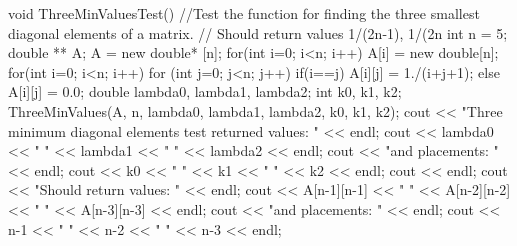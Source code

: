 \documentclass[norsk, 12pt]{article}
\begin{document}
void ThreeMinValuesTest(){
    //Test the function for finding the three smallest diagonal elements of a matrix.
    // Should return values 1/(2n-1), 1/(2n
    int n = 5;
    double ** A;
    A = new double* [n];
    for(int i=0; i<n; i++){
        A[i] = new double[n];
    }
    for(int i=0; i<n; i++){
        for (int j=0; j<n; j++){
            if(i==j){
                A[i][j] = 1./(i+j+1);
            }
            else{
                A[i][j] = 0.0;
            }
        }
    }
    double lambda0, lambda1, lambda2;
    int k0, k1, k2;
    ThreeMinValues(A, n, lambda0, lambda1, lambda2, k0, k1, k2);
    cout << "Three minimum diagonal elements test returned values: " << endl;
    cout << lambda0 << "    " << lambda1 << "      " << lambda2 << endl;
    cout << "and placements: " << endl;
    cout << k0 << "     " << k1 << "      " << k2 << endl;
    cout << endl;
    cout << "Should return values: " << endl;
    cout << A[n-1][n-1] << "    " << A[n-2][n-2] << "    " << A[n-3][n-3] << endl;
    cout << "and placements: " << endl;
    cout << n-1 <<  "       " << n-2 << "       " << n-3 << endl;
}
\end{document}
